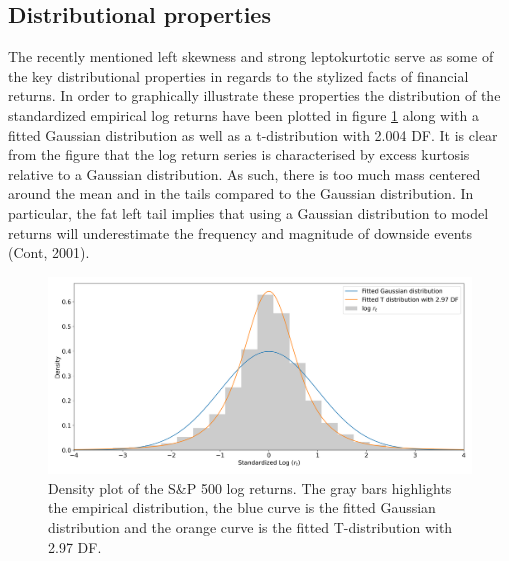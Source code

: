 
\newpage


\subsection{Distributional properties}
The recently mentioned left skewness and strong leptokurtotic serve as some of the key distributional properties in regards to the stylized facts of financial returns. In order to graphically illustrate these properties the distribution of the standardized empirical log returns have been plotted in figure \ref{fig: Kernel_distributions} along with a fitted Gaussian distribution as well as a t-distribution with 2.004 DF. It is clear from the figure that the log return series is characterised by excess kurtosis relative to a Gaussian distribution. As such, there is too much mass centered around the mean and in the tails compared to the Gaussian distribution. In particular, the fat left tail implies that using a Gaussian distribution to model returns will underestimate the frequency and magnitude of downside events (Cont, 2001). 

\begin{figure}[H] 
    \centering
    \includegraphics[width=1\textwidth]{analysis/data_description/images/SP500_distribution.png}
    \caption[Density plot of the S\&P 500 log returns] {Density plot of the S\&P 500 log returns. The gray bars highlights the empirical distribution, the blue curve is the fitted Gaussian distribution and the orange curve is the fitted T-distribution with 2.97 DF.}
    \label{fig: Kernel_distributions}
\end{figure}

